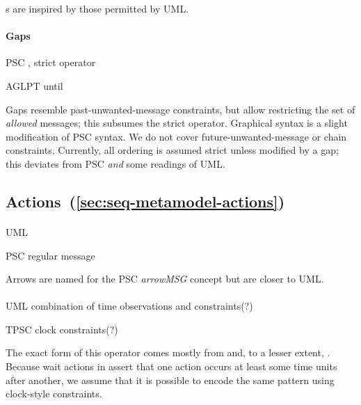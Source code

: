 \mloopbound s are inspired by those permitted by UML.

\paragraph{Gaps}
\begin{featset}
\item[PSC] , strict operator
\item[AGLPT] until
\end{featset}

Gaps resemble past-unwanted-message constraints, but
allow restricting the set of \emph{allowed} messages;
this subsumes the strict operator.  Graphical syntax is a slight
modification of PSC syntax.  We do not cover
future-unwanted-message or chain constraints.  Currently, all
ordering is assumed strict unless modified by a gap; this
deviates from PSC \emph{and} some readings of UML.

\subsection{Actions~(\ref{sec:seq-metamodel-actions})}

\paragraph{\marrowaction}
\begin{featset}
\item[UML] 
\item[PSC] regular message
\end{featset}

Arrows are named for the PSC \emph{arrowMSG} concept but are closer
to UML.

\paragraph{\mwaitaction}
\begin{featset}
\item[UML] combination of time observations and constraints(?)
\item[TPSC] clock constraints(?)
\end{featset}

The exact form of this operator comes mostly from \robochart{} and, to
a lesser extent, \tockcsp.
Because wait actions in \langname{} assert that one
action occurs at least some time units after another, we assume that it is
possible to encode the same pattern using clock-style constraints.

